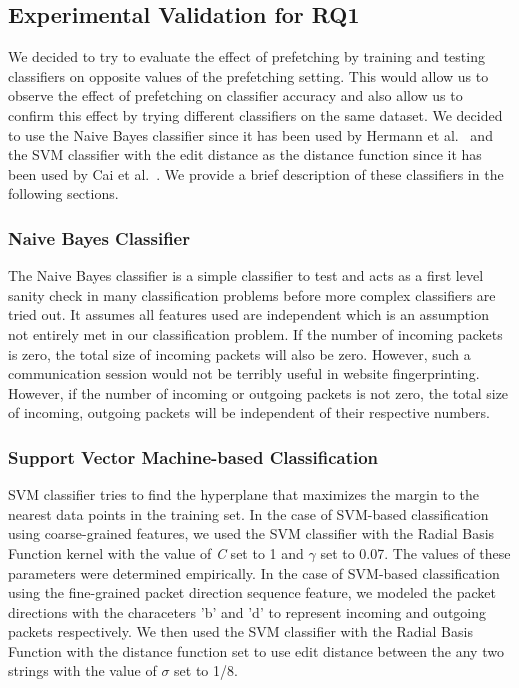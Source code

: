 \subsection{Experimental Validation for RQ1}
We decided to try to evaluate the effect of prefetching by training and testing classifiers on opposite values of the prefetching setting. 
This would allow us to observe the effect of prefetching on classifier accuracy and also allow us to confirm this effect by trying different classifiers on the same dataset.
We decided to use the Naive Bayes classifier since it has been used by Hermann et al.~\cite{hermann} and the SVM classifier with the edit distance as the distance function since it has been used by Cai et al.~\cite{cai2012touching}. We provide a brief description of these classifiers in the following sections.

\subsubsection{Naive Bayes Classifier} 
The Naive Bayes classifier is a simple classifier to test and acts as a first level sanity check in many classification problems before more complex classifiers are tried out. 
It assumes all features used are independent which is an assumption not entirely met in our classification problem. 
If the number of incoming packets is zero, the total size of incoming packets will also be zero.
However, such a communication session would not be terribly useful in website fingerprinting.
However, if the number of incoming or outgoing packets is not zero, the total size of incoming, outgoing packets will be independent of their respective numbers.

\subsubsection{Support Vector Machine-based Classification}
SVM classifier tries to find the hyperplane that maximizes the margin to the nearest data points in the training set. 
In the case of SVM-based classification using coarse-grained features, we used the SVM classifier with the Radial Basis Function kernel with the value of \textit{C} set to 1 and $\gamma$ set to 0.07. The values of these parameters were determined empirically. 
In the case of SVM-based classification using the fine-grained packet direction sequence feature, we modeled the packet directions with the characeters 'b' and 'd' to represent incoming and outgoing packets respectively. 
We then used the SVM classifier with the Radial Basis Function with the distance function set to use edit distance between the any two strings with the value of $\sigma$ set to 1/8. 

